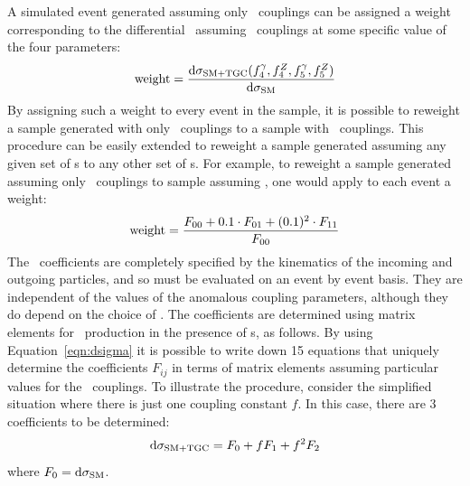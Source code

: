 A simulated event generated assuming only \sm\ couplings can be assigned a weight corresponding to the differential \cx\
assuming \TGC\ couplings at some specific value of the four parameters:
\begin{equation}
{\rm weight} = \frac{{\rm d}\sigma_{\rm SM+TGC}(f_{4}^{\gamma}, f_{4}^{Z}, f_{5}^{\gamma},
f_{5}^{Z})}{{\rm d}\sigma_{\rm SM}}
\end{equation}
By assigning such a weight to every event in the sample, it is possible to reweight a sample
generated with only \sm\ couplings to a sample with \TGC\ couplings.
This procedure can be easily extended to reweight a sample generated assuming
any given set of \TGC s to any other set of \TGC s. For example, to reweight a sample
generated assuming only \sm\ couplings to sample assuming \ffourg=0.1, one would
apply to each event a weight:
\begin{eqnarray}\label{revisit}
{\rm weight} = \frac{F_{00} + 0.1 \cdot  F_{01} + (0.1)^{2} \cdot
F_{11}}{F_{00}}
\end{eqnarray}
The \Fij\ coefficients are completely
specified by the kinematics of the incoming and outgoing particles, and so must
be evaluated on an event by event basis. They are
independent of the values of the anomalous coupling parameters, although they do depend on
the choice of \formfactor. The coefficients are determined using matrix elements for
\ZZllll\ production in the presence of \TGC s, as follows. By using Equation~\ref{eqn:dsigma} it 
is possible to write down 15 equations that uniquely determine the 
coefficients $F_{ij}$ in terms of matrix elements assuming particular values
for the \TGC\ couplings.
To illustrate the procedure, consider the simplified situation where 
there is just one coupling constant $f$. In this case, there are 3 coefficients 
to be determined:
\begin{eqnarray}\label{revisit2}
{\rm d}\sigma_{\rm SM+TGC} = F_0 + fF_1 + f^2F_2 
\end{eqnarray}
where  $F_0={\rm d}\sigma_{\rm SM}$.


